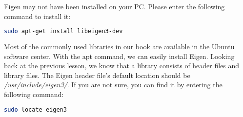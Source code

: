 Eigen may not have been installed on your PC. Please enter the following command to install it:

\begin{lstlisting}[language=sh,caption=Terminal input:]
sudo apt-get install libeigen3-dev
\end{lstlisting}

Most of the commonly used libraries in our book are available in the Ubuntu software center. With the apt command, we can easily install Eigen. Looking back at the previous lesson, we know that a library consists of header files and library files. The Eigen header file's default location should be  \textit{/usr/include/eigen3/}. If you are not sure, you can find it by entering the following command:

\begin{lstlisting}[language=sh,caption=Terminal input:]
sudo locate eigen3
\end{lstlisting}

